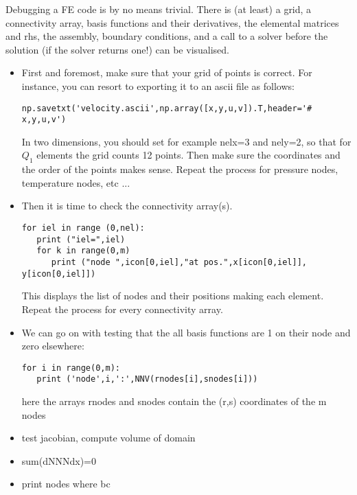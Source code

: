Debugging a FE code is by no means trivial. There is (at least) a grid, a connectivity array, basis functions and their derivatives, the elemental matrices and rhs, the assembly, boundary conditions, and a call to a solver before the solution (if the solver returns one!) can be visualised. 
\begin{itemize}
\item First and foremost, make sure that your grid of points is correct.
For instance, you can resort to exporting it to an ascii file as follows:
\begin{lstlisting}
np.savetxt('velocity.ascii',np.array([x,y,u,v]).T,header='# x,y,u,v')
\end{lstlisting}
In two dimensions, you should set for example nelx=3 and nely=2, so that 
for $Q_1$ elements the grid counts 12 points. Then make sure the coordinates and the order of the points makes sense. 
Repeat the process for pressure nodes, temperature nodes, etc ...

\item Then it is time to check the connectivity array(s). 
\begin{lstlisting}
for iel in range (0,nel):
   print ("iel=",iel)
   for k in range(0,m)
      print ("node ",icon[0,iel],"at pos.",x[icon[0,iel]], y[icon[0,iel]])
\end{lstlisting}
This displays the list of nodes and their positions making each element.
Repeat the process for every connectivity array.

\item We can go on with testing that the all basis functions are 1 on their node and  zero elsewhere:
\begin{lstlisting}
for i in range(0,m):
   print ('node',i,':',NNV(rnodes[i],snodes[i]))
\end{lstlisting}
here the arrays rnodes and snodes contain the (r,s) coordinates of the m nodes 

\item test jacobian, compute volume of domain

\item sum(dNNNdx)=0

\item print nodes where bc 

\end{itemize}

